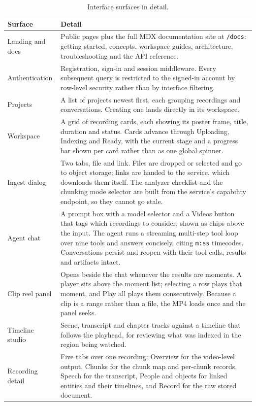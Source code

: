 \documentclass[11pt,a4paper]{article}
\begin{document}
\begin{table}[htbp]
\centering
\small
\begin{tabularx}{\textwidth}{@{}L{2.6cm}X@{}}
\toprule
\textbf{Surface} & \textbf{Detail} \\
\midrule
Landing and docs & Public pages plus the full MDX documentation site at
\texttt{/docs}: getting started, concepts, workspace guides, architecture,
troubleshooting and the API reference. \\
Authentication & Registration, sign-in and session middleware. Every subsequent
query is restricted to the signed-in account by row-level security rather than
by interface filtering. \\
Projects & A list of projects newest first, each grouping recordings and
conversations. Creating one lands directly in its workspace. \\
Workspace & A grid of recording cards, each showing its poster frame, title,
duration and status. Cards advance through Uploading, Indexing and Ready, with
the current stage and a progress bar shown per card rather than as one global
spinner. \\
Ingest dialog & Two tabs, file and link. Files are dropped or selected and go to
object storage; links are handed to the service, which downloads them itself.
The analyzer checklist and the chunking mode selector are built from the
service's capability endpoint, so they cannot go stale. \\
Agent chat & A prompt box with a model selector and a Videos button that tags
which recordings to consider, shown as chips above the input. The agent runs a
streaming multi-step tool loop over nine tools and answers concisely, citing
\texttt{m:ss} timecodes. Conversations persist and reopen with their tool calls,
results and artifacts intact. \\
Clip reel panel & Opens beside the chat whenever the results are moments. A
player sits above the moment list; selecting a row plays that moment, and Play
all plays them consecutively. Because a clip is a range rather than a file, the
MP4 loads once and the panel seeks. \\
Timeline studio & Scene, transcript and chapter tracks against a timeline that
follows the playhead, for reviewing what was indexed in the region being
watched. \\
Recording detail & Five tabs over one recording: Overview for the video-level
output, Chunks for the chunk map and per-chunk records, Speech for the
transcript, People and objects for linked entities and their timelines, and
Record for the raw stored document. \\
\bottomrule
\end{tabularx}
\caption{Interface surfaces in detail.}
\end{table}
\end{document}
